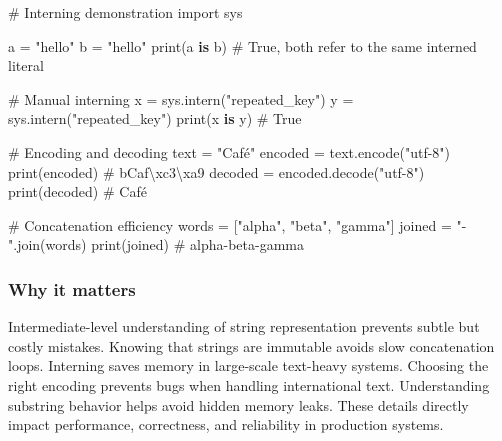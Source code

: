\documentclass[
  letterpaper,
  DIV=11,
  numbers=noendperiod]{scrreprt}
\newenvironment{Shaded}{\begin{snugshade}}{\end{snugshade}}
\newcommand{\BuiltInTok}[1]{\textcolor[rgb]{0.00,0.23,0.31}{#1}}
\newcommand{\CommentTok}[1]{\textcolor[rgb]{0.37,0.37,0.37}{#1}}
\newcommand{\ImportTok}[1]{\textcolor[rgb]{0.00,0.46,0.62}{#1}}
\newcommand{\KeywordTok}[1]{\textcolor[rgb]{0.00,0.23,0.31}{\textbf{#1}}}
\newcommand{\NormalTok}[1]{\textcolor[rgb]{0.00,0.23,0.31}{#1}}
\newcommand{\OperatorTok}[1]{\textcolor[rgb]{0.37,0.37,0.37}{#1}}
\newcommand{\StringTok}[1]{\textcolor[rgb]{0.13,0.47,0.30}{#1}}
\begin{document}
\begin{Shaded}
\begin{Highlighting}[]
\CommentTok{\# Interning demonstration}
\ImportTok{import}\NormalTok{ sys}

\NormalTok{a }\OperatorTok{=} \StringTok{"hello"}
\NormalTok{b }\OperatorTok{=} \StringTok{"hello"}
\BuiltInTok{print}\NormalTok{(a }\KeywordTok{is}\NormalTok{ b)  }\CommentTok{\# True, both refer to the same interned literal}

\CommentTok{\# Manual interning}
\NormalTok{x }\OperatorTok{=}\NormalTok{ sys.}\BuiltInTok{intern}\NormalTok{(}\StringTok{"repeated\_key"}\NormalTok{)}
\NormalTok{y }\OperatorTok{=}\NormalTok{ sys.}\BuiltInTok{intern}\NormalTok{(}\StringTok{"repeated\_key"}\NormalTok{)}
\BuiltInTok{print}\NormalTok{(x }\KeywordTok{is}\NormalTok{ y)  }\CommentTok{\# True}

\CommentTok{\# Encoding and decoding}
\NormalTok{text }\OperatorTok{=} \StringTok{"Café"}
\NormalTok{encoded }\OperatorTok{=}\NormalTok{ text.encode(}\StringTok{"utf{-}8"}\NormalTok{)}
\BuiltInTok{print}\NormalTok{(encoded)  }\CommentTok{\# b\textquotesingle{}Caf\textbackslash{}xc3\textbackslash{}xa9\textquotesingle{}}
\NormalTok{decoded }\OperatorTok{=}\NormalTok{ encoded.decode(}\StringTok{"utf{-}8"}\NormalTok{)}
\BuiltInTok{print}\NormalTok{(decoded)  }\CommentTok{\# Café}

\CommentTok{\# Concatenation efficiency}
\NormalTok{words }\OperatorTok{=}\NormalTok{ [}\StringTok{"alpha"}\NormalTok{, }\StringTok{"beta"}\NormalTok{, }\StringTok{"gamma"}\NormalTok{]}
\NormalTok{joined }\OperatorTok{=} \StringTok{"{-}"}\NormalTok{.join(words)}
\BuiltInTok{print}\NormalTok{(joined)  }\CommentTok{\# alpha{-}beta{-}gamma}
\end{Highlighting}
\end{Shaded}

\subsubsection{Why it matters}\label{why-it-matters-31}

Intermediate-level understanding of string representation prevents
subtle but costly mistakes. Knowing that strings are immutable avoids
slow concatenation loops. Interning saves memory in large-scale
text-heavy systems. Choosing the right encoding prevents bugs when
handling international text. Understanding substring behavior helps
avoid hidden memory leaks. These details directly impact performance,
correctness, and reliability in production systems.
\end{document}
